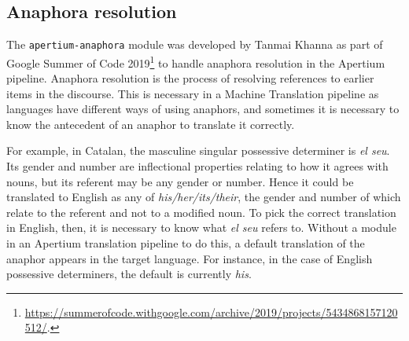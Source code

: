 \documentclass[free]{flammie}
\newcommand{\examp}[1]{\emph{#1}}
\begin{document}
\subsection{Anaphora resolution}\label{sec:AnaphoraResol}

The \texttt{apertium-anaphora} module was developed by Tanmai Khanna as part of
Google Summer of Code
2019\footnote{\url{https://summerofcode.withgoogle.com/archive/2019/projects/5434868157120512/}.}
to handle anaphora resolution in the Apertium pipeline. Anaphora resolution is
the process of resolving references to earlier items in the discourse. This is
necessary in a Machine Translation pipeline as languages have different ways of
using anaphors, and sometimes it is necessary to know the antecedent of an
anaphor to translate it correctly.

For example, in Catalan, the masculine singular possessive determiner is
\examp{el seu}.  Its gender and number are inflectional properties relating to
how it agrees with nouns, but its referent may be any gender or number.  Hence
it could be translated to English as any of \examp{his/her/its/their}, the
gender and number of which relate to the referent and not to a modified noun. To
pick the correct translation in English, then, it is necessary to know what
\examp{el seu} refers to. Without a module in an Apertium translation pipeline
to do this, a default translation of the anaphor appears in the target language.
For instance, in the case of English possessive determiners, the default is
currently \examp{his}.
\end{document}
